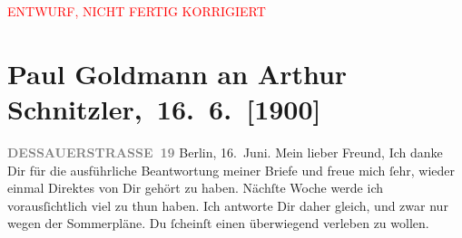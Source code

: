 
\begin{center}
            \textcolor{red}{ENTWURF, NICHT FERTIG KORRIGIERT}
                      \end{center}
            
         
         \renewcommand{\erwaehntePersonen}{Personen: Richard Beer-Hofmann, Alfred Kerr, Leopoldine Müller, Olga Schnitzler, Leo Van-Jung}
         \renewcommand{\erwaehnteOrte}{Orte: Alpen, Berlin, Dessauer Straße, Dolomiten, Innsbruck, Pontresina, Schruns, Schweiz, Tirol, Trafoi, Vorarlberg, Wien}
         \renewcommand{\erwaehnteWerke}{}
               \section[ Paul Goldmann an Arthur Schnitzler, 16. 6. {[}1900{]}]{ Paul Goldmann an Arthur Schnitzler, 16. 6. {[}1900{]}}\nopagebreak{}\rehead{ }\begin{ledgroupsized}[t]{13cm}\normalsize\beginnumbering \toendnotes[C]{\smallbreak\pagebreak[2]} 
\toendnotes[C]{\smallbreak}\pstart{}{\pb}\textcolor{gray}{\textbf{DESSAUERSTRASSE 19}}\pend{}{\bigskip}\pstart
           \raggedleft{}Berlin, 16. Juni.\pend
           \pstart\center{}Mein lieber Freund,\pend\pstart
           Ich danke Dir für die ausführliche Beantwortung meiner Briefe und freue mich ſehr,
               wieder einmal Direktes von Dir gehört zu haben. Nächſte Woche werde ich
               vorausſichtlich viel zu thun haben. Ich antworte Dir daher gleich, und zwar nur wegen
               der Sommerpläne.\pend
           \pstart
           Du ſcheinſt einen überwiegend \label{K_L02920-1v}\label{K_L02920-1h} verleben zu wollen.\pend

\end{ledgroupsized}
